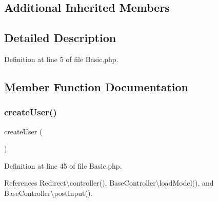 \subsection*{Additional Inherited Members}


\subsection{Detailed Description}


Definition at line 5 of file Basic.\+php.



\subsection{Member Function Documentation}
\hypertarget{class_basic_a967982ee98f05287bbdba812f6016947}{}\label{class_basic_a967982ee98f05287bbdba812f6016947} 
\subsubsection{\texorpdfstring{create\+User()}{createUser()}}
{\footnotesize\ttfamily create\+User (\begin{DoxyParamCaption}{ }\end{DoxyParamCaption})}



Definition at line 45 of file Basic.\+php.



References Redirect\textbackslash{}controller(), Base\+Controller\textbackslash{}load\+Model(), and Base\+Controller\textbackslash{}post\+Input().


\hypertarget{class_basic_a934aeeec370d904f3a58bde4d514259d}{}\label{class_basic_a934aeeec370d904f3a58bde4d514259d} 
